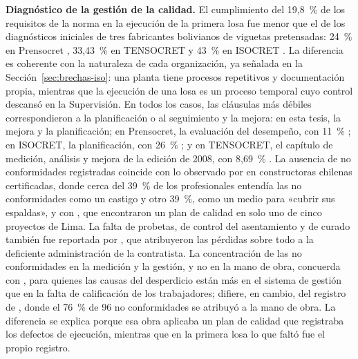 \textbf{Diagnóstico de la gestión de la calidad.} El cumplimiento del 19,8~\% de los requisitos de la norma en la ejecución de la primera losa fue menor que el de los diagnósticos iniciales de tres fabricantes bolivianos de viguetas pretensadas: 24~\% en Prensocret \parencite[pp.~47--49]{mamanicalsina2025}, 33,43~\% en TENSOCRET \parencite[p.~79]{pajarito2015} y 43~\% en ISOCRET \parencite[p.~71]{pena2024}. La diferencia es coherente con la naturaleza de cada organización, ya señalada en la Sección~\ref{sec:brechas-iso}: una planta tiene procesos repetitivos y documentación propia, mientras que la ejecución de una losa es un proceso temporal cuyo control descansó en la Supervisión. En todos los casos, las cláusulas más débiles correspondieron a la planificación o al seguimiento y la mejora: en esta tesis, la mejora y la planificación; en Prensocret, la evaluación del desempeño, con 11~\% \parencite[p.~48]{mamanicalsina2025}; en ISOCRET, la planificación, con 26~\% \parencite[p.~71]{pena2024}; y en TENSOCRET, el capítulo de medición, análisis y mejora de la edición de 2008, con 8,69~\% \parencite[p.~77]{pajarito2015}. La ausencia de no conformidades registradas coincide con lo observado por \textcite[p.~202]{romero2007} en constructoras chilenas certificadas, donde cerca del 39~\% de los profesionales entendía las no conformidades como un castigo y otro 39~\%, como un medio para «cubrir sus espaldas», y con \textcite[p.~80]{gudiel2020}, que encontraron un plan de calidad en solo uno de cinco proyectos de Lima. La falta de probetas, de control del asentamiento y de curado también fue reportada por \textcite[p.~81]{aguilar2016}, que atribuyeron las pérdidas sobre todo a la deficiente administración de la contratista. La concentración de las no conformidades en la medición y la gestión, y no en la mano de obra, concuerda con \textcite[p.~327]{formoso1999}, para quienes las causas del desperdicio están más en el sistema de gestión que en la falta de calificación de los trabajadores; difiere, en cambio, del registro de \textcite[p.~16]{muro2020}, donde el 76~\% de 96 no conformidades se atribuyó a la mano de obra. La diferencia se explica porque esa obra aplicaba un plan de calidad que registraba los defectos de ejecución, mientras que en la primera losa lo que faltó fue el propio registro.

